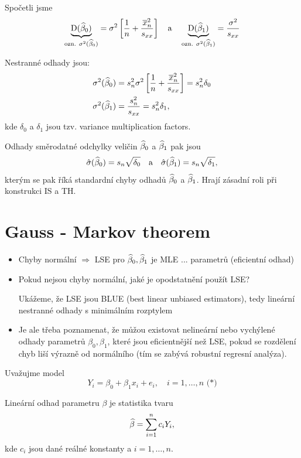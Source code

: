 \begin{remark}
	Spočetli jsme
	$$
		\underbrace{\mathrm{D}(\widehat{\beta}_0)}_{\text{ozn. } \sigma^2(\widehat{\beta}_0)} = \sigma^2 \left[ \frac{1}{n} + \frac{\overline{x}_n^2}{s_{xx}} \right] \quad \text{a} \quad \underbrace{\mathrm{D}(\widehat{\beta}_1)}_{\text{ozn. } \sigma^2(\widehat{\beta}_1)} = \frac{\sigma^2}{s_{xx}}
	$$
	
	Nestranné odhady jsou:
	\begin{align*}
		\sigma^2(\widehat{\beta}_0) & = s_n^2 \sigma^2 \left[ \frac{1}{n} + \frac{\overline{x}_n^2}{s_{xx}} \right] = s_n^2 \delta_0 \\
		\sigma^2(\widehat{\beta}_1) & = \frac{s_n^2}{s_{xx}} = s_n^2 \delta_1,
	\end{align*}
	kde $\delta_0$ a $\delta_1$ jsou tzv. variance multiplication factors.
	
	Odhady směrodatné odchylky veličin $\widehat{\beta}_0$ a $\widehat{\beta}_1$ pak jsou
	$$
		\hat{\sigma}(\widehat{\beta}_0) = s_n \sqrt{\delta_0} \quad \text{a} \quad \hat{\sigma}(\widehat{\beta}_1) = s_n \sqrt{\delta_1},
	$$
	kterým se pak říká standardní chyby odhadů $\widehat{\beta}_0$ a $\widehat{\beta}_1$. Hrají zásadní roli při konstrukci IS a TH.
\end{remark}

\section{Gauss - Markov theorem}

\begin{itemize}
	\item Chyby normální $\Rightarrow$ LSE pro $\widehat{\beta}_0, \widehat{\beta}_1$ je MLE ... parametrů (eficientní odhad)
	\item Pokud nejsou chyby normální, jaké je opodstatnění použít LSE?
	
	Ukážeme, že LSE jsou BLUE (best linear unbiased estimators), tedy lineární nestranné odhady s minimálním rozptylem
	\item Je ale třeba poznamenat, že můžou existovat nelineární nebo vychýlené odhady parametrů $\beta_0, \beta_1$, které jsou eficientnější než LSE, pokud se rozdělení chyb liší výrazně od normálního (tím se zabývá robustní regresní analýza).
\end{itemize}

Uvažujme model
$$
	Y_i = \beta_0 + \beta_1 x_i + e_i, \quad i = 1, \dots, n \text{ (*)}
$$

\begin{define}
	Lineární odhad parametru $\beta$ je statistika tvaru
	$$
		\widehat{\beta} = \sum\limits_{i=1}^{n} c_i Y_i,
	$$
	kde $c_i$ jsou dané reálné konstanty a $i = 1, \dots, n$.
\end{define}

